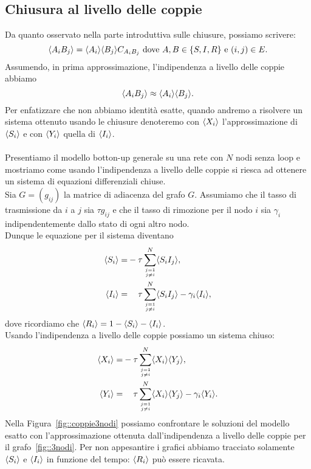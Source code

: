\subsection{Chiusura al livello delle coppie}
Da quanto osservato nella parte introduttiva sulle chiusure, possiamo scrivere:
$$ \langle  A_i B_j \rangle = \langle  A_i \rangle \langle B_j \rangle C_{A_i B_j} \text{ dove } A,B\in \{S,I,R\} \text{ e } (i,j)\in E.$$ 
Assumendo, in prima approssimazione, l'indipendenza a livello delle coppie abbiamo 
$$ \langle  A_i B_j \rangle \approx \langle A_i \rangle\langle B_j \rangle.$$ 
Per enfatizzare che non abbiamo identit\`a esatte, quando andremo a risolvere un sistema ottenuto usando le chiusure denoteremo  con $\langle X_i \rangle$ l'approssimazione di $\langle  S_i \rangle$ e con $\langle  Y_i \rangle$ quella di $\langle  I_i \rangle$.\\ \\
Presentiamo il modello botton-up generale su una rete con $N$ nodi senza loop e mostriamo come usando l'indipendenza a livello delle coppie si riesca ad ottenere un sistema di equazioni differenziali chiuse.\\
Sia $G=(g_{ij})$ la matrice di adiacenza del grafo $G$. Assumiamo che il tasso di trasmissione da $i$ a $j$ sia $\tau g_{ij}$ e che il tasso di rimozione per il nodo $i$ sia $\gamma_i$ indipendentemente dallo stato di ogni altro nodo.\\
Dunque le equazione per il sistema diventano
\begin{equation}
\begin{aligned}
	 \angol{ S_i} =& -\tau \sum_{j=1\atop{j\neq i }}^N\angol{ S_i I_j},\\
	 \angol{I_i} =&\spa \tau \sum_{j=1\atop{j\neq i}}^N \angol{ S_i I_j} -\gamma_i \angol{I_i},
\end{aligned}
\end{equation}
dove ricordiamo che $\langle R_i \rangle=1-\langle S_i \rangle- \langle I_i \rangle$.\\
Usando l'indipendenza a livello delle coppie possiamo un sistema chiuso: 
\begin{equation}
\begin{aligned}
	 \angol{ X_i} =& -\tau \sum_{j=1\atop{j\neq i }}^N\angol{ X_i} \angol{Y_j},\\
	 \angol{Y_i} =&\spa \tau \sum_{j=1\atop{j\neq i}}^N \angol{ X_i}\angol{Y_j} -\gamma_i \angol{Y_i}.
\end{aligned}
\label{Coppie3nodi}
\end{equation}
Nella Figura~\ref{fig::coppie3nodi} possiamo confrontare le soluzioni del modello esatto con l'approssimazione ottenuta  dall'indipendenza a livello delle coppie per il grafo~\ref{fig::3nodi}. Per non appesantire i grafici abbiamo tracciato solamente  $\langle S_i \rangle$ e $\langle I_i \rangle$ in funzione  del tempo: $\langle  R_i \rangle$ pu\`o essere ricavata.
